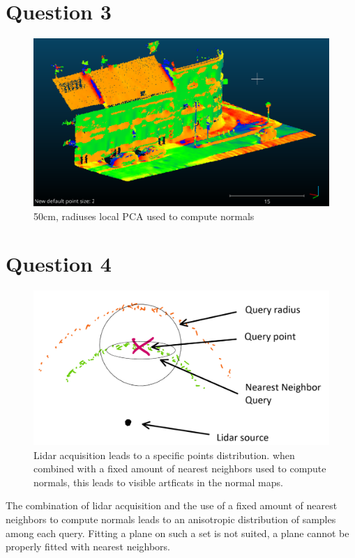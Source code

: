 \documentclass[a4paper]{article}
\begin{document}
\section*{Question 3}
\begin{figure}[ht]
  \centering
  \includegraphics[width=.9\linewidth]{figures/cc_normals_PCA_50cm_bigger_points.png}
  \caption{50cm, radiuses local PCA used to compute normals}
  \label{fig:local_pca}
\end{figure}


\section*{Question 4}
\begin{figure}[ht]
  \centering
  \includegraphics[width=.9\linewidth]{figures/Schema.png}
  \caption{Lidar acquisition leads to a specific points distribution. when combined with a fixed amount
  of nearest neighbors used to compute normals, this leads to visible artficats in the normal maps.
  } 
  \label{fig:lidar}
\end{figure}

The combination of lidar acquisition and the use of a fixed amount of nearest neighbors 
to compute normals leads to an anisotropic distribution of samples among each query.
Fitting a plane on such a set is not suited, a plane cannot be properly fitted with nearest neighbors.
\end{document}
